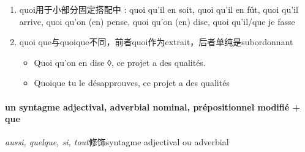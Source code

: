 \documentclass[UTF8]{report}
\begin{document}
\begin{enumerate}
    \item quoi用于小部分固定搭配中 : quoi qu’il en soit, quoi qu’il en fût, quoi qu’il arrive, quoi qu’on (en) pense, quoi qu’on (en) dise, quoi qu’il/que je fasse
    \item quoi que与quoique不同，前者quoi作为extrait，后者单纯是subordonnant
    \begin{itemize}
        \item Quoi qu’on en dise ◊, ce projet a des qualités.
        \item Quoique tu le désapprouves, ce projet a des qualités
    \end{itemize}
\end{enumerate}

\paragraph{un syntagme adjectival, adverbial nominal, prépositionnel modifié + que}
\textit{aussi, quelque, si, tout}修饰syntagme adjectival ou adverbial
\end{document}
